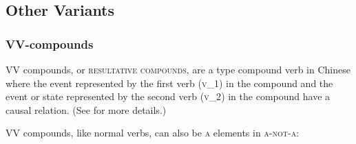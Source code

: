 \documentclass[12pt, UTF8]{article}
\begin{document}
%
%
%
%
%
%
%
%
%

\subsection{Other Variants}

\subsubsection{VV-compounds}

VV compounds, or \textsc{resultative compounds}, are a type compound verb in Chinese where the event represented by the first verb (\textsc{v_1}) in the compound and the event or state represented by the second verb (\textsc{v_2}) in the compound have a causal relation. (See \cite{Li1990} for more details.)

VV compounds, like normal verbs, can also be \textsc{a} elements in \textsc{a-not-a}:

\begin{exe}


\end{exe}
\end{document}
